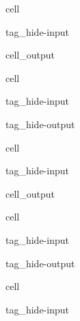 \documentclass[letterpaper,10pt,english,openany,oneside]{jupyterBook}
\begin{document}
\begin{sphinxuseclass}{cell}
\begin{sphinxuseclass}{tag_hide-input}\begin{sphinxVerbatimOutput}

\begin{sphinxuseclass}{cell_output}
\noindent{}

\end{sphinxuseclass}\end{sphinxVerbatimOutput}

\end{sphinxuseclass}
\end{sphinxuseclass}
\begin{sphinxuseclass}{cell}
\begin{sphinxuseclass}{tag_hide-input}
\begin{sphinxuseclass}{tag_hide-output}
\end{sphinxuseclass}
\end{sphinxuseclass}
\end{sphinxuseclass}
\begin{sphinxuseclass}{cell}
\begin{sphinxuseclass}{tag_hide-input}\begin{sphinxVerbatimOutput}

\begin{sphinxuseclass}{cell_output}
\noindent{}

\end{sphinxuseclass}\end{sphinxVerbatimOutput}

\end{sphinxuseclass}
\end{sphinxuseclass}
\begin{sphinxuseclass}{cell}
\begin{sphinxuseclass}{tag_hide-input}
\begin{sphinxuseclass}{tag_hide-output}
\end{sphinxuseclass}
\end{sphinxuseclass}
\end{sphinxuseclass}
\begin{sphinxuseclass}{cell}
\begin{sphinxuseclass}{tag_hide-input}
\end{sphinxuseclass}
\end{sphinxuseclass}
\end{document}
